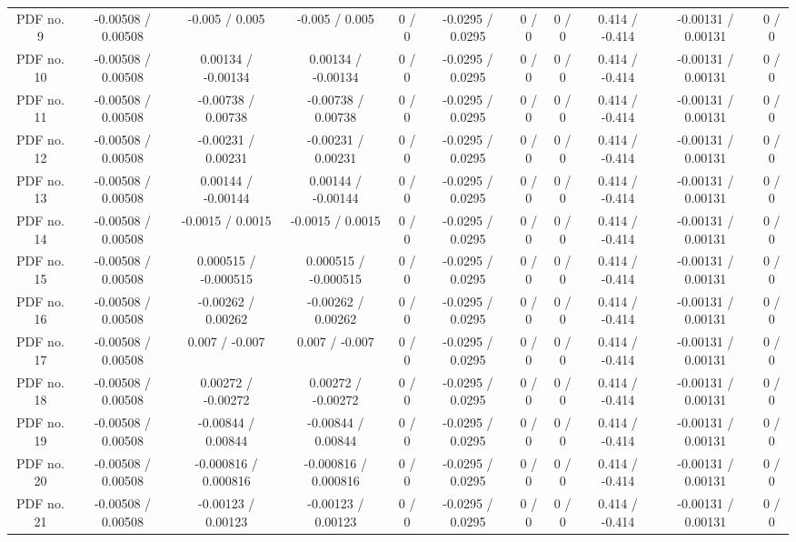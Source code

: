 \begin{table}[htbp]
\begin{center}
\begin{tabular}{|c|c|c|c|c|c|c|c|c|c|c|}
  PDF no. 9 & -0.00508 / 0.00508 & -0.005 / 0.005 & -0.005 / 0.005 & 0 / 0 & -0.0295 / 0.0295 & 0 / 0 & 0 / 0 & 0.414 / -0.414 & -0.00131 / 0.00131 & 0 / 0 \\ 
  PDF no. 10 & -0.00508 / 0.00508 & 0.00134 / -0.00134 & 0.00134 / -0.00134 & 0 / 0 & -0.0295 / 0.0295 & 0 / 0 & 0 / 0 & 0.414 / -0.414 & -0.00131 / 0.00131 & 0 / 0 \\ 
  PDF no. 11 & -0.00508 / 0.00508 & -0.00738 / 0.00738 & -0.00738 / 0.00738 & 0 / 0 & -0.0295 / 0.0295 & 0 / 0 & 0 / 0 & 0.414 / -0.414 & -0.00131 / 0.00131 & 0 / 0 \\ 
  PDF no. 12 & -0.00508 / 0.00508 & -0.00231 / 0.00231 & -0.00231 / 0.00231 & 0 / 0 & -0.0295 / 0.0295 & 0 / 0 & 0 / 0 & 0.414 / -0.414 & -0.00131 / 0.00131 & 0 / 0 \\ 
  PDF no. 13 & -0.00508 / 0.00508 & 0.00144 / -0.00144 & 0.00144 / -0.00144 & 0 / 0 & -0.0295 / 0.0295 & 0 / 0 & 0 / 0 & 0.414 / -0.414 & -0.00131 / 0.00131 & 0 / 0 \\ 
  PDF no. 14 & -0.00508 / 0.00508 & -0.0015 / 0.0015 & -0.0015 / 0.0015 & 0 / 0 & -0.0295 / 0.0295 & 0 / 0 & 0 / 0 & 0.414 / -0.414 & -0.00131 / 0.00131 & 0 / 0 \\ 
  PDF no. 15 & -0.00508 / 0.00508 & 0.000515 / -0.000515 & 0.000515 / -0.000515 & 0 / 0 & -0.0295 / 0.0295 & 0 / 0 & 0 / 0 & 0.414 / -0.414 & -0.00131 / 0.00131 & 0 / 0 \\ 
  PDF no. 16 & -0.00508 / 0.00508 & -0.00262 / 0.00262 & -0.00262 / 0.00262 & 0 / 0 & -0.0295 / 0.0295 & 0 / 0 & 0 / 0 & 0.414 / -0.414 & -0.00131 / 0.00131 & 0 / 0 \\ 
  PDF no. 17 & -0.00508 / 0.00508 & 0.007 / -0.007 & 0.007 / -0.007 & 0 / 0 & -0.0295 / 0.0295 & 0 / 0 & 0 / 0 & 0.414 / -0.414 & -0.00131 / 0.00131 & 0 / 0 \\ 
  PDF no. 18 & -0.00508 / 0.00508 & 0.00272 / -0.00272 & 0.00272 / -0.00272 & 0 / 0 & -0.0295 / 0.0295 & 0 / 0 & 0 / 0 & 0.414 / -0.414 & -0.00131 / 0.00131 & 0 / 0 \\ 
  PDF no. 19 & -0.00508 / 0.00508 & -0.00844 / 0.00844 & -0.00844 / 0.00844 & 0 / 0 & -0.0295 / 0.0295 & 0 / 0 & 0 / 0 & 0.414 / -0.414 & -0.00131 / 0.00131 & 0 / 0 \\ 
  PDF no. 20 & -0.00508 / 0.00508 & -0.000816 / 0.000816 & -0.000816 / 0.000816 & 0 / 0 & -0.0295 / 0.0295 & 0 / 0 & 0 / 0 & 0.414 / -0.414 & -0.00131 / 0.00131 & 0 / 0 \\ 
  PDF no. 21 & -0.00508 / 0.00508 & -0.00123 / 0.00123 & -0.00123 / 0.00123 & 0 / 0 & -0.0295 / 0.0295 & 0 / 0 & 0 / 0 & 0.414 / -0.414 & -0.00131 / 0.00131 & 0 / 0 \\ 

\end{tabular}
\end{center}
\end{table}
